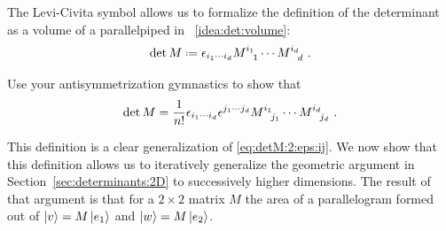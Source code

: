The Levi-Civita symbol allows us to formalize the definition of the determinant as a volume of a parallelpiped in \bigidearef{}~\ref{idea:det:volume}:
\begin{align}
    \det M \defeq \epsilon_{i_1 \cdots i_d} M\aij{i_1}{1}\cdots M\aij{i_d}{d} \ .
    \label{eq:levi:civita:determinant:definition}
\end{align}
\begin{exercise}
Use your antisymmetrization gymnastics to show that
\begin{align}
    \det M = \frac{1}{n!}
    \epsilon_{i_1 \cdots i_d}
    \epsilon^{j_1 \cdots j_d}
    M\aij{i_1}{j_1}\cdots M\aij{i_d}{j_d} \ .
    \label{eq:levi:civita:determinant:definition:totally:antisymmetrized}
\end{align}
\end{exercise}
This definition is a clear generalization of \eqref{eq:detM:2:eps:ij}. We now show that this definition allows us to iteratively generalize the geometric argument in Section~\ref{sec:determinants:2D} to successively higher dimensions. The result of that argument is that for a $2\times 2$ matrix $M$ the area of a parallelogram formed out of $\left|v\right\rangle=M\left|e_1\right\rangle$ and $\left|w\right\rangle=M\left|e_2\right\rangle$. 

